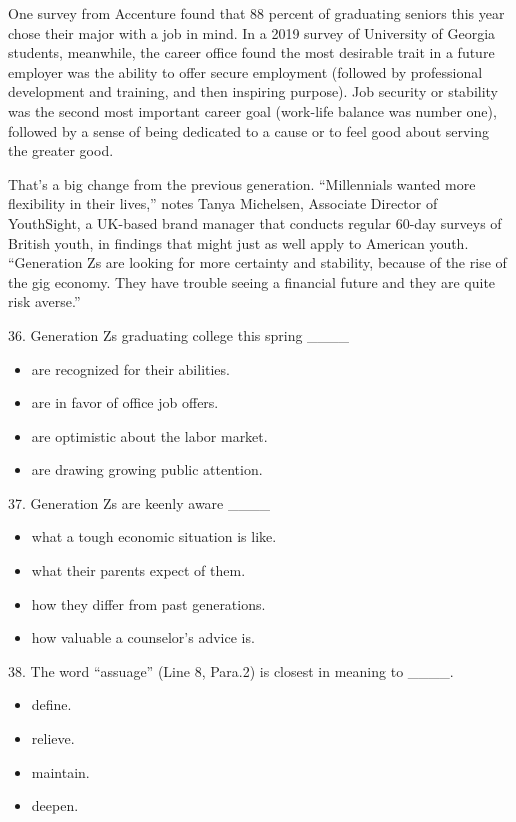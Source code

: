 \documentclass[UTF8,11pt]{ctexart}
\begin{document}
One survey from Accenture found that 88 percent of graduating seniors this year chose their major with a job in mind. In a 2019 survey of University of Georgia students, meanwhile, the career office found the most desirable trait in a future employer was the ability to offer secure employment (followed by professional development and training, and then inspiring purpose). Job security or stability was the second most important career goal (work-life balance was number one), followed by a sense of being dedicated to a cause or to feel good about serving the greater good.


That’s a big change from the previous generation. “Millennials wanted more flexibility in their lives,” notes Tanya Michelsen, Associate Director of YouthSight, a UK-based brand manager that conducts regular 60-day surveys of British youth, in findings that might just as well apply to American youth. “Generation Zs are looking for more certainty and stability, because of the rise of the gig economy. They have trouble seeing a financial future and they are quite risk averse.”


36. Generation Zs graduating college this spring \_\_\_\_


\begin{itemize}[leftmargin=2em,itemsep=.2em,topsep=.4em]\item[A.] are recognized for their abilities.
\item[B.] are in favor of office job offers.
\item[C.] are optimistic about the labor market.
\item[D.] are drawing growing public attention.
\end{itemize}

37. Generation Zs are keenly aware \_\_\_\_


\begin{itemize}[leftmargin=2em,itemsep=.2em,topsep=.4em]\item[A.] what a tough economic situation is like.
\item[B.] what their parents expect of them.
\item[C.] how they differ from past generations.
\item[D.] how valuable a counselor’s advice is.
\end{itemize}

38. The word “assuage” (Line 8, Para.2) is closest in meaning to \_\_\_\_.


\begin{itemize}[leftmargin=2em,itemsep=.2em,topsep=.4em]\item[A.] define.
\item[B.] relieve.
\item[C.] maintain.
\item[D.] deepen.
\end{itemize}
\end{document}
